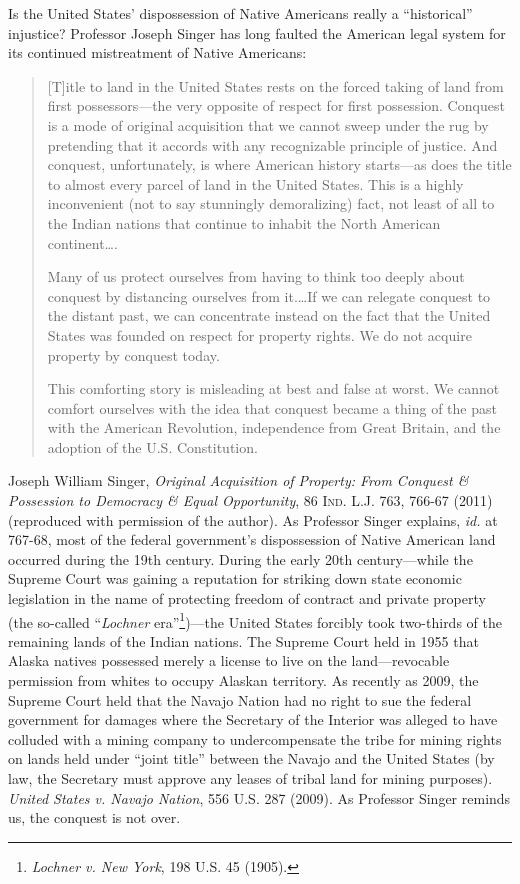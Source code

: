 \item Is the United States' dispossession of Native Americans really a
``historical'' injustice? Professor Joseph Singer has long faulted the American
legal system for its continued mistreatment of Native Americans:
\begin{quotation}
[T]itle to land in the United States rests on the forced taking of land from
first possessors---the very opposite of respect for first possession. Conquest
is a mode of original acquisition that we cannot sweep under the rug by
pretending that it accords with any recognizable principle of justice. And
conquest, unfortunately, is where American history starts---as does the title to
almost every parcel of land in the United States. This is a highly inconvenient
(not to say stunningly demoralizing) fact, not least of all to the Indian
nations that continue to inhabit the North American continent\ldots .

Many of us protect ourselves from having to think too deeply about conquest by
distancing ourselves from it.\ldots If we can relegate conquest to the distant
past, we can concentrate instead on the fact that the United States was founded
on respect for property rights. We do not acquire property by conquest today.

This comforting story is misleading at best and false at worst. We cannot
comfort ourselves with the idea that conquest became a thing of the past with
the American Revolution, independence from Great Britain, and the adoption of
the U.S. Constitution.
\end{quotation}
Joseph William Singer, \textit{Original Acquisition of Property: From Conquest
\& Possession to Democracy \& Equal Opportunity}, 86 \textsc{Ind. L.J.} 763,
766-67 (2011) (reproduced with permission of the author). As Professor Singer
explains, \textit{id.} at 767-68, most of the federal government's dispossession
of Native American land occurred during the 19th century. During the early 20th
century---while the Supreme Court was gaining a reputation for striking down
state economic legislation in the name of protecting freedom of contract and
private property (the so-called ``\textit{Lochner} era''\footnote{\emph{Lochner
v. New York}, 198 U.S. 45 (1905).})---the United States forcibly took
two-thirds of the remaining lands of the Indian nations. The Supreme Court held
in 1955 that Alaska natives possessed merely a license to live on the
land---revocable permission from whites to occupy Alaskan territory. As recently
as 2009, the Supreme Court held that the Navajo Nation had no right to sue the
federal government for damages where the Secretary of the Interior was alleged
to have colluded with a mining company to undercompensate the tribe for mining
rights on lands held under ``joint title'' between the Navajo and the United
States (by law, the Secretary must approve any leases of tribal land for mining
purposes). \textit{United States v. Navajo Nation}, 556 U.S. 287 (2009). As
Professor Singer reminds us, the conquest is not over.

